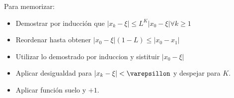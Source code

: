 \documentclass{article}
\begin{document}
Para memorizar:
\begin{itemize}
	\item Demostrar por inducción que \(|x_{k}-\xi | \leq L^{K} |x_{0}-\xi | \forall k \geq 1\)
	\item Reordenar hasta obtener \(|x_0 - \xi |(1-L) \leq |x_0-x_1|\)
	\item Utilizar lo demostrado por induccion y sistituir \(|x_0-\xi|\)
	\item Aplicar desigualdad para \(|x_k - \xi|<\varepsillon\) y despejar para \(K\).
	\item Aplicar función suelo y \(+1\). 
\end{itemize}
\end{document}
